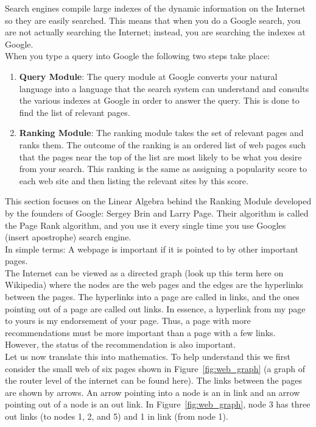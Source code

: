 \documentclass{article}
\begin{document}
\noindent Search engines compile large indexes of the dynamic information on the Internet so they are easily searched. This means that when you do a Google search, you are not actually searching the Internet; instead, you are searching the indexes at Google.\\

When you type a query into Google the following two steps take place:
\begin{enumerate}
    \item \textbf{Query Module}: The query module at Google converts your natural language into a language that the search system can understand and consults the various indexes at Google in order to answer the query. This is done to find the list of relevant pages. 
    \item \textbf{Ranking Module}: The ranking module takes the set of relevant pages and ranks them. The outcome of the ranking is an ordered list of web pages such that the pages near the top of the list are most likely to be what you desire from your search. This ranking is the same as assigning a popularity score to each web site and then listing the relevant sites by this score.
\end{enumerate}

\noindent This section focuses on the Linear Algebra behind the Ranking Module developed by the founders of Google: Sergey Brin and Larry Page. Their algorithm is called the Page Rank algorithm, and you use it every single time you use Googles (insert apostrophe) search engine.\\

\noindent In simple terms: A webpage is important if it is pointed to by other important pages.\\

\noindent The Internet can be viewed as a directed graph (look up this term here on Wikipedia) where the nodes are the web pages and the edges are the hyperlinks between the pages. The hyperlinks into a page are called in links, and the ones pointing out of a page are called out links. In essence, a hyperlink from my page to yours is my endorsement of your page. Thus, a page with more recommendations must be more important than a page with a few links. However, the status of the recommendation is also important.\\

\noindent Let us now translate this into mathematics. To help understand this we first consider the small web of six pages shown in Figure~\ref{fig:web_graph} (a graph of the router level of the internet can be found here). The links between the pages are shown by arrows. An arrow pointing into a node is an in link and an arrow pointing out of a node is an out link. In Figure~\ref{fig:web_graph}, node 3 has three out links (to nodes 1, 2, and 5) and 1 in link (from node 1).
\end{document}
